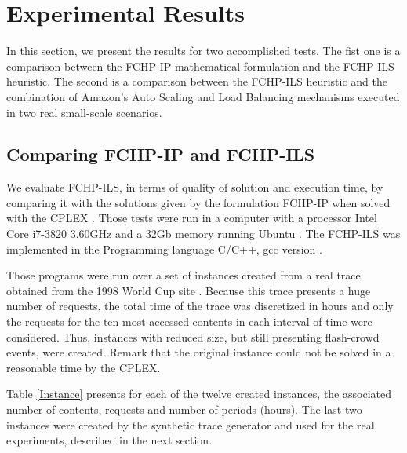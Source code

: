 \section{Experimental Results}
\label{sec:result}

	In this section, we present the results for two accomplished tests. The fist one is a  comparison between the FCHP-IP mathematical formulation and the FCHP-ILS heuristic. The second is a  comparison between the FCHP-ILS heuristic and the combination of  Amazon’s Auto Scaling and Load Balancing mechanisms \cite{AS,ELB}  executed in two real small-scale scenarios.

\subsection{Comparing FCHP-IP and FCHP-ILS}
	 We evaluate FCHP-ILS, in terms of  quality of solution and execution time,  by comparing it with the solutions given by the formulation FCHP-IP when solved with the CPLEX  \cite{cplex}. Those tests were run  in a computer with a processor Intel Core i7-3820 3.60GHz  and  a 32Gb memory running Ubuntu . The  FCHP-ILS was implemented in the Programming language C/C++, gcc version .
	
	 Those programs were run over a set of instances created from a  real trace obtained from the 1998 World Cup site \cite{copa98}.  Because this trace presents a huge number of requests, the total time of the trace was discretized in hours and only the requests for the ten most accessed contents in each interval of time were considered. Thus, instances with reduced size, but still presenting flash-crowd events, were created. Remark that the original instance could not be solved in a reasonable time by the CPLEX. 

Table \ref{Instance} presents for each of the twelve created instances, the  associated number of contents, requests and number of periods (hours). The last two instances were created by the synthetic trace generator and used for the real experiments, described in the next section.
	
